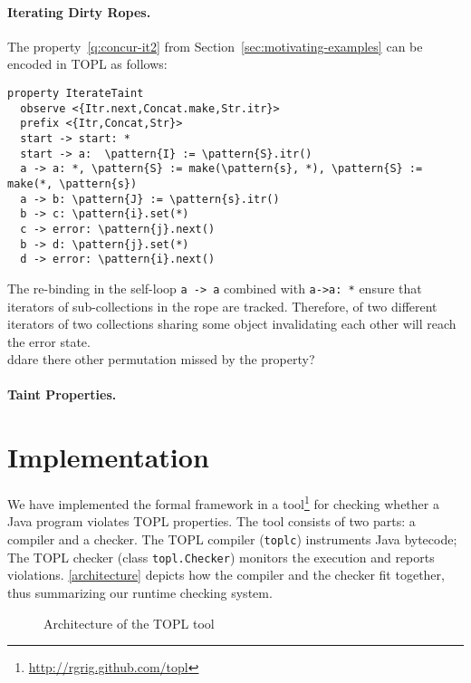 \documentclass[9pt, preprint]{sigplanconf} %
\newcommand{\noterg}[2]{\textcolor{gray}{[\textcolor{red}{#1}: #2]}}
\newcommand{\dd}[1]{\noterg{dd}{#1}}
\newcommand{\delimitVerbatim}{\par\nobreak\smallskip\noindent}
\newcommand{\pattern}[1]{\ensuremath{\mathtt{\underline{#1}}}}
\theoremstyle{definition}
\theoremstyle{remark}
\begin{document}
\paragraph{Iterating Dirty Ropes.} %
The property~\eqref{q:concur-it2} from Section~\ref{sec:motivating-examples} can be encoded in TOPL as follows:
%
\delimitVerbatim
\begin{Verbatim}[commandchars=\\\{\}]
property IterateTaint
  observe <{Itr.next,Concat.make,Str.itr}>
  prefix <{Itr,Concat,Str}>
  start -> start: *
  start -> a:  \pattern{I} := \pattern{S}.itr()
  a -> a: *, \pattern{S} := make(\pattern{s}, *), \pattern{S} := make(*, \pattern{s})
  a -> b: \pattern{J} := \pattern{s}.itr()
  b -> c: \pattern{i}.set(*)
  c -> error: \pattern{j}.next()
  b -> d: \pattern{j}.set(*)
  d -> error: \pattern{i}.next()
\end{Verbatim}
\delimitVerbatim
The re-binding in the self-loop {\tt a -> a} combined with {\tt a->a: *} ensure that iterators of sub-collections in the rope are tracked. Therefore,
of two different iterators of two collections sharing some object invalidating each other will reach the error state. 
\\dd{are there other permutation missed by the property?}

\paragraph{Taint Properties.} %



\section{Implementation} \label{sec:implementation} %
We have implemented the formal framework in a tool\footnote{\url{http://rgrig.github.com/topl}} for checking whether a Java program violates 
TOPL properties.
The tool consists of two parts: a compiler and a checker.
The TOPL compiler ({\tt toplc}) instruments Java bytecode;
The TOPL checker (class {\tt topl.Checker}) monitors the execution and reports violations.
\autoref{architecture} depicts how the compiler and the checker fit together, thus summarizing our runtime checking system.

\begin{figure}[t]
\begin{center}

\caption{Architecture of the TOPL tool}
\label{architecture}
\end{center}
\end{figure}
\end{document}
